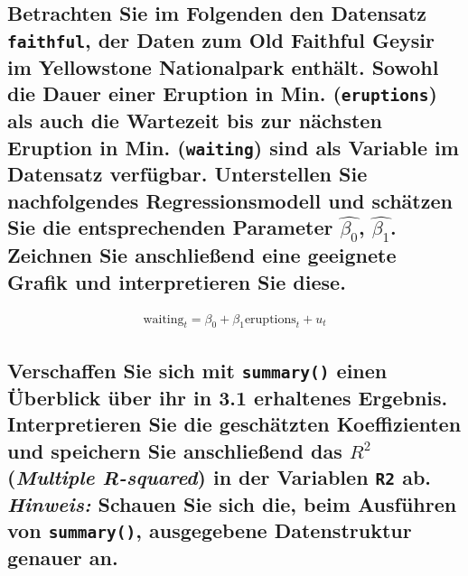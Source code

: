 \documentclass[12pt,a4paper]{article}
\begin{document}
\subsection{\texorpdfstring{Betrachten Sie im Folgenden den Datensatz
\texttt{faithful}, der Daten zum Old Faithful Geysir im Yellowstone
Nationalpark enthält. Sowohl die Dauer einer Eruption in Min.
(\texttt{eruptions}) als auch die Wartezeit bis zur nächsten Eruption in
Min. (\texttt{waiting}) sind als Variable im Datensatz verfügbar.
Unterstellen Sie nachfolgendes Regressionsmodell und schätzen Sie die
entsprechenden Parameter \(\widehat{\beta_0}\), \(\widehat{\beta_1}\).
Zeichnen Sie anschließend eine geeignete Grafik und interpretieren Sie
diese.}{Betrachten Sie im Folgenden den Datensatz faithful, der Daten zum Old Faithful Geysir im Yellowstone Nationalpark enthält. Sowohl die Dauer einer Eruption in Min. (eruptions) als auch die Wartezeit bis zur nächsten Eruption in Min. (waiting) sind als Variable im Datensatz verfügbar. Unterstellen Sie nachfolgendes Regressionsmodell und schätzen Sie die entsprechenden Parameter \textbackslash widehat\{\textbackslash beta\_0\}, \textbackslash widehat\{\textbackslash beta\_1\}. Zeichnen Sie anschließend eine geeignete Grafik und interpretieren Sie diese.}}\label{betrachten-sie-im-folgenden-den-datensatz-faithful-der-daten-zum-old-faithful-geysir-im-yellowstone-nationalpark-enthuxe4lt.-sowohl-die-dauer-einer-eruption-in-min.-eruptions-als-auch-die-wartezeit-bis-zur-nuxe4chsten-eruption-in-min.-waiting-sind-als-variable-im-datensatz-verfuxfcgbar.-unterstellen-sie-nachfolgendes-regressionsmodell-und-schuxe4tzen-sie-die-entsprechenden-parameter-widehatbeta_0-widehatbeta_1.-zeichnen-sie-anschlieuxdfend-eine-geeignete-grafik-und-interpretieren-sie-diese.}

\begin{align*}
  \text{waiting}_t = \beta_0+\beta_1 \text{eruptions}_t + u_t 
\end{align*}

\subsection{\texorpdfstring{Verschaffen Sie sich mit \texttt{summary()}
einen Überblick über ihr in 3.1 erhaltenes Ergebnis. Interpretieren Sie
die geschätzten Koeffizienten und speichern Sie anschließend das \(R^2\)
(\emph{Multiple R-squared}) in der Variablen \texttt{R2} ab.
\emph{Hinweis:} Schauen Sie sich die, beim Ausführen von
\texttt{summary()}, ausgegebene Datenstruktur genauer
an.}{Verschaffen Sie sich mit summary() einen Überblick über ihr in 3.1 erhaltenes Ergebnis. Interpretieren Sie die geschätzten Koeffizienten und speichern Sie anschließend das R\^{}2 (Multiple R-squared) in der Variablen R2 ab. Hinweis: Schauen Sie sich die, beim Ausführen von summary(), ausgegebene Datenstruktur genauer an.}}\label{verschaffen-sie-sich-mit-summary-einen-uxfcberblick-uxfcber-ihr-in-3.1-erhaltenes-ergebnis.-interpretieren-sie-die-geschuxe4tzten-koeffizienten-und-speichern-sie-anschlieuxdfend-das-r2-multiple-r-squared-in-der-variablen-r2-ab.-hinweis-schauen-sie-sich-die-beim-ausfuxfchren-von-summary-ausgegebene-datenstruktur-genauer-an.}
\end{document}
